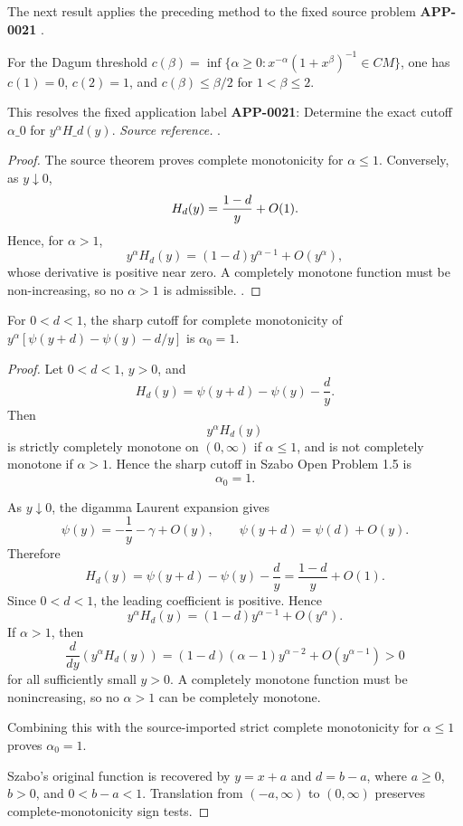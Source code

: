 The next result applies the preceding method to the fixed source problem \textbf{APP-0021} \cite{szabo-cm}.
\begin{proposition}[APP-0021: Szabo's cutoff problem has \(\alpha\_0=1\)]
\label{res:dagum-c-endpoints-and-upper-gate}
For the Dagum threshold \(c(\beta)=\inf\{\alpha\ge0:x^{-\alpha}(1+x^\beta)^{-1}\in CM\}\), one has \(c(1)=0\), \(c(2)=1\), and \(c(\beta)\le\beta/2\) for \(1<\beta\le2\).

This resolves the fixed application label \textbf{APP-0021}: Determine the exact cutoff \(\alpha\_0\) for \(y^\alpha H\_d(y)\).
\emph{Source reference.} \cite{szabo-cm}.
\end{proposition}
\begin{proof}
The source theorem proves complete monotonicity for \(\alpha\le1\).  Conversely,
as \(y\downarrow0\),
\[
  H_d(y)={1-d\over y}+O(1).
\]
Hence, for \(\alpha>1\),
\[
  y^\alpha H_d(y)=(1-d)y^{\alpha-1}+O(y^\alpha),
\]
whose derivative is positive near zero.  A completely monotone function must be
non-increasing, so no \(\alpha>1\) is admissible. \cite{szabo-cm}.
\end{proof}

\begin{proposition}
\label{res:szabo-psi-difference-alpha0-exact-one}
For \(0<d<1\), the sharp cutoff for complete monotonicity of \(y^\alpha[\psi(y+d)-\psi(y)-d/y]\) is \(\alpha_0=1\).
\end{proposition}
\begin{proof}
Let \(0<d<1\), \(y>0\), and
\[
H_d(y)=\psi(y+d)-\psi(y)-\frac{d}{y}.
\]
Then
\[
y^\alpha H_d(y)
\]
is strictly completely monotone on \((0,\infty)\) if \(\alpha\le 1\), and is not completely monotone if \(\alpha>1\). Hence the sharp cutoff in Szabo Open Problem 1.5 is
\[
\alpha_0=1.
\]

As \(y\downarrow0\), the digamma Laurent expansion gives
\[
\psi(y)=-\frac1y-\gamma+O(y),
\qquad
\psi(y+d)=\psi(d)+O(y).
\]
Therefore
\[
H_d(y)=\psi(y+d)-\psi(y)-\frac{d}{y}
=\frac{1-d}{y}+O(1).
\]
Since \(0<d<1\), the leading coefficient is positive. Hence
\[
y^\alpha H_d(y)=(1-d)y^{\alpha-1}+O(y^\alpha).
\]
If \(\alpha>1\), then
\[
\frac{d}{dy}\left(y^\alpha H_d(y)\right)
=(1-d)(\alpha-1)y^{\alpha-2}+O(y^{\alpha-1})>0
\]
for all sufficiently small \(y>0\). A completely monotone function must be nonincreasing, so no \(\alpha>1\) can be completely monotone.

Combining this with the source-imported strict complete monotonicity for \(\alpha\le1\) proves \(\alpha_0=1\).

Szabo's original function is recovered by \(y=x+a\) and \(d=b-a\), where \(a\ge0\), \(b>0\), and \(0<b-a<1\). Translation from \((-a,\infty)\) to \((0,\infty)\) preserves complete-monotonicity sign tests.
\end{proof}

